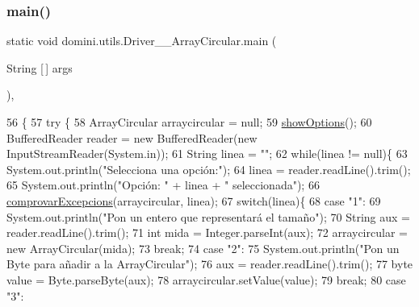 \subsubsection{\texorpdfstring{main()}{main()}}
{\footnotesize\ttfamily static void domini.\+utils.\+Driver\+\_\+\+\_\+\+Array\+Circular.\+main (\begin{DoxyParamCaption}\item[{String \mbox{[}$\,$\mbox{]}}]{args }\end{DoxyParamCaption})\hspace{0.3cm}{\ttfamily [inline]}, {\ttfamily [static]}}


\begin{DoxyCode}
56                                            \{
57     \textcolor{keywordflow}{try} \{
58         ArrayCircular arraycircular = null;
59         \hyperlink{classdomini_1_1utils_1_1Driver____ArrayCircular_afac5a37f91b2914e692993e71c2d393c}{showOptions}();
60         BufferedReader reader = \textcolor{keyword}{new} BufferedReader(\textcolor{keyword}{new} InputStreamReader(System.in));
61         String linea = \textcolor{stringliteral}{""};
62         \textcolor{keywordflow}{while}(linea != null)\{
63             System.out.println(\textcolor{stringliteral}{"Selecciona una opción:"});
64             linea = reader.readLine().trim();
65             System.out.println(\textcolor{stringliteral}{"Opción: "} + linea + \textcolor{stringliteral}{" seleccionada"});
66             \hyperlink{classdomini_1_1utils_1_1Driver____ArrayCircular_a0f5f42c5ace9176cfcae4dfe9717f380}{comprovarExcepcions}(arraycircular, linea);
67             \textcolor{keywordflow}{switch}(linea)\{
68                 \textcolor{keywordflow}{case} \textcolor{stringliteral}{"1"}:
69                     System.out.println(\textcolor{stringliteral}{"Pon un entero que representará el tamaño"});
70                     String aux = reader.readLine().trim();
71                     \textcolor{keywordtype}{int} mida = Integer.parseInt(aux);
72                     arraycircular = \textcolor{keyword}{new} ArrayCircular(mida);
73                 \textcolor{keywordflow}{break};
74                 \textcolor{keywordflow}{case} \textcolor{stringliteral}{"2"}:
75                     System.out.println(\textcolor{stringliteral}{"Pon un Byte para añadir a la ArrayCircular"});
76                     aux = reader.readLine().trim();
77                     byte value = Byte.parseByte(aux);
78                     arraycircular.setValue(value);
79                 \textcolor{keywordflow}{break};
80                 \textcolor{keywordflow}{case} \textcolor{stringliteral}{"3"}:

\end{DoxyCode}

